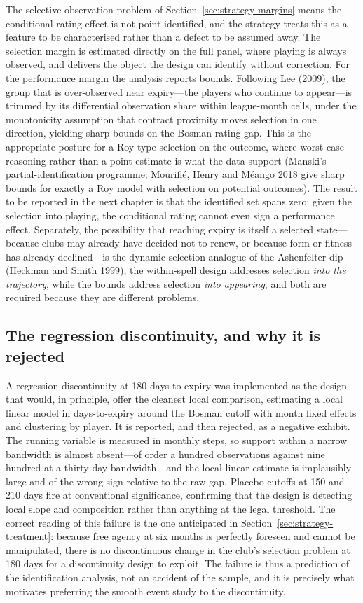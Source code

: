 \documentclass{article}
\begin{document}
The selective-observation problem of Section~\ref{sec:strategy-margins} means the
conditional rating effect is not point-identified, and the strategy treats this as
a feature to be characterised rather than a defect to be assumed away. The
selection margin is estimated directly on the full panel, where playing is always
observed, and delivers the object the design can identify without correction. For
the performance margin the analysis reports bounds. Following Lee (2009), the
group that is over-observed near expiry---the players who continue to appear---is
trimmed by its differential observation share within league-month cells, under the
monotonicity assumption that contract proximity moves selection in one direction,
yielding sharp bounds on the Bosman rating gap. This is the appropriate posture for
a Roy-type selection on the outcome, where worst-case reasoning rather than a
point estimate is what the data support (Manski's partial-identification
programme; Mourifi\'e, Henry and M\'eango 2018 give sharp bounds for exactly a Roy
model with selection on potential outcomes). The result to be reported in the next
chapter is that the identified set spans zero: given the selection into playing, the
conditional rating cannot even sign a performance effect. Separately, the
possibility that reaching expiry is itself a selected state---because clubs may
already have decided not to renew, or because form or fitness has already
declined---is the dynamic-selection analogue of the Ashenfelter dip (Heckman and
Smith 1999); the within-spell design addresses selection \emph{into the
trajectory}, while the bounds address selection \emph{into appearing}, and both are
required because they are different problems.

\subsection{The regression discontinuity, and why it is rejected}
\label{sec:strategy-rdd}

A regression discontinuity at 180 days to expiry was implemented as the design that
would, in principle, offer the cleanest local comparison, estimating a local linear
model in days-to-expiry around the Bosman cutoff with month fixed effects and
clustering by player. It is reported, and then rejected, as a negative exhibit. The
running variable is measured in monthly steps, so support within a narrow bandwidth
is almost absent---of order a hundred observations against nine hundred at a
thirty-day bandwidth---and the local-linear estimate is implausibly large and of
the wrong sign relative to the raw gap. Placebo cutoffs at 150 and 210 days fire at
conventional significance, confirming that the design is detecting local slope and
composition rather than anything at the legal threshold. The correct reading of this
failure is the one anticipated in Section~\ref{sec:strategy-treatment}: because free
agency at six months is perfectly foreseen and cannot be manipulated, there is no
discontinuous change in the club's selection problem at 180 days for a discontinuity
design to exploit. The failure is thus a prediction of the identification analysis,
not an accident of the sample, and it is precisely what motivates preferring the
smooth event study to the discontinuity.
\end{document}
